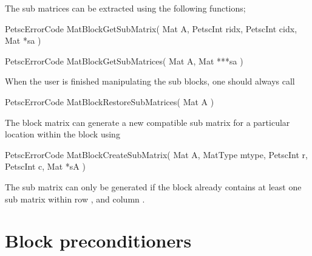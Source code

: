 \documentclass[10pt,a4paper]{amsart}
\renewcommand{\v}[1]{\boldsymbol{#1}}		%
\newcommand{\m}[1]{\boldsymbol{#1}}		%
\newcommand{\code}[1]{{\fontfamily{txtt}\selectfont {#1}}}
\begin{document}
The sub matrices can be extracted using the following functions;
\begin{verbatimtab}[4]
	PetscErrorCode MatBlockGetSubMatrix( Mat A, PetscInt ridx, PetscInt cidx, Mat *sa )

	PetscErrorCode MatBlockGetSubMatrices( Mat A, Mat ***sa )
\end{verbatimtab}
When the user is finished manipulating the sub blocks, one should always call 
\begin{verbatimtab}[4]
	PetscErrorCode MatBlockRestoreSubMatrices( Mat A )
\end{verbatimtab}
	
The block matrix can generate a new compatible sub matrix for a particular location within the block using
\begin{verbatimtab}[4]
	PetscErrorCode MatBlockCreateSubMatrix( Mat A, 
		MatType mtype, PetscInt r, PetscInt c, Mat *sA )
\end{verbatimtab}
The sub matrix \code{sA} can only be generated if the block already contains at least one sub matrix within row \code{r}, and column \code{c}.

\section{Block preconditioners}
	         
\end{document}
